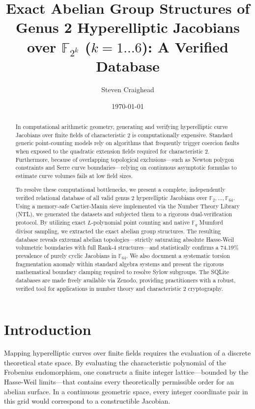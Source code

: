 \documentclass[letterpaper, 11pt]{article}
\title{Exact Abelian Group Structures of Genus 2 Hyperelliptic Jacobians over \texorpdfstring{$\mathbb{F}_{2^k}$}{F\_2\textasciicircum k} (\texorpdfstring{$k=1 \dots 6$}{k=1..6}): A Verified Database}
\author{Steven Craighead}
\date{\today}
\begin{document}
\maketitle

\begin{abstract}
In computational arithmetic geometry, generating and verifying hyperelliptic curve Jacobians over finite fields of characteristic 2 is computationally expensive. Standard generic point-counting models rely on algorithms that frequently trigger coercion faults when exposed to the quadratic extension fields required for characteristic 2. Furthermore, because of overlapping topological exclusions—such as Newton polygon constraints and Serre curve boundaries—relying on continuous asymptotic formulas to estimate curve volumes fails at low field sizes. 

To resolve these computational bottlenecks, we present a complete, independently verified relational database of all valid genus 2 hyperelliptic Jacobians over $\mathbb{F}_2, \dots, \mathbb{F}_{64}$. Using a memory-safe Cartier-Manin sieve implemented via the Number Theory Library (NTL), we generated the datasets and subjected them to a rigorous dual-verification protocol. By utilizing exact $L$-polynomial point counting and native $\mathbb{F}_q$ Mumford divisor sampling, we extracted the exact abelian group structures. The resulting database reveals extremal abelian topologies—strictly saturating absolute Hasse-Weil volumetric boundaries with full Rank-4 structures—and statistically confirms a 74.19\% prevalence of purely cyclic Jacobians in $\mathbb{F}_{64}$. We also document a systematic torsion fragmentation anomaly within standard algebra systems and present the rigorous mathematical boundary clamping required to resolve Sylow subgroups. The SQLite databases are made freely available via Zenodo, providing practitioners with a robust, verified tool for applications in number theory and characteristic 2 cryptography.
\end{abstract}

\section{Introduction}
Mapping hyperelliptic curves over finite fields requires the evaluation of a discrete theoretical state space. By evaluating the characteristic polynomial of the Frobenius endomorphism, one constructs a finite integer lattice—bounded by the Hasse-Weil limits—that contains every theoretically permissible order for an abelian surface. In a continuous geometric space, every integer coordinate pair in this grid would correspond to a constructible Jacobian.
\end{document}
